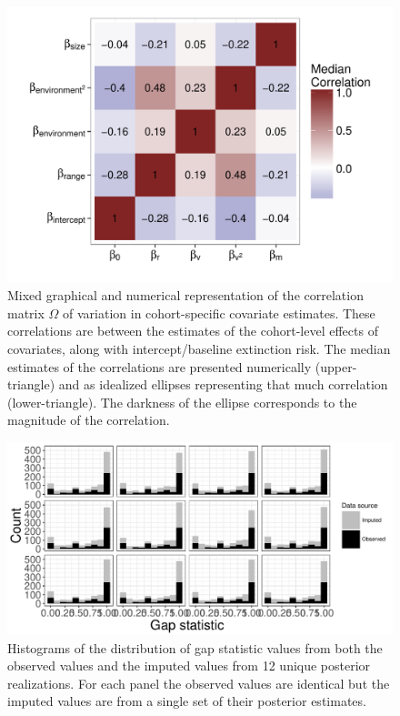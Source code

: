 \documentclass{article}
\begin{document}
\begin{figure}[ht]
  \centering
  \includegraphics[height = 0.8\textheight,width=\textwidth,keepaspectratio=true]{figure/wei_cor_heatmap}
  \caption{Mixed graphical and numerical representation of the correlation matrix \(\Omega\) of variation in cohort-specific covariate estimates. These correlations are between the estimates of the cohort-level effects of covariates, along with intercept/baseline extinction risk. The median estimates of the correlations are presented numerically (upper-triangle) and as idealized ellipses representing that much correlation (lower-triangle). The darkness of the ellipse corresponds to the magnitude of the correlation.}
  \label{fig:cor_posterior}
\end{figure}

\begin{figure}[ht]
  \centering
  \includegraphics[height = 0.8\textheight,width=\textwidth,keepaspectratio=true]{figure/imputation_compare}
  \caption{Histograms of the distribution of gap statistic values from both the observed values and the imputed values from 12 unique posterior realizations. For each panel the observed values are identical but the imputed values are from a single set of their posterior estimates.}
  \label{fig:impute_results}
\end{figure}
\end{document}
